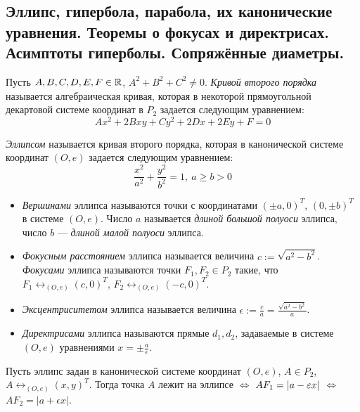 \subsection{Эллипс, гипербола, парабола, их канонические уравнения. Теоремы о фокусах и директрисах. Асимптоты гиперболы. Сопряжённые диаметры.}
    
    \begin{definition}
    	Пусть $A, B, C, D, E, F \in \mathbb{R}$, $A^2 + B^2 + C^2 \ne 0$. \textit{Кривой второго порядка} называется алгебраическая кривая, которая в некоторой прямоугольной декартовой системе координат в $P_2$ задается следующим уравнением:
    	\[Ax^2 + 2Bxy + Cy^2 + 2Dx + 2Ey + F = 0\]
    \end{definition}
    
    \begin{definition}
    	\textit{Эллипсом} называется кривая второго порядка, которая в канонической системе координат $(O, e)$ задается следующим уравнением:
    	\[\frac{x^2}{a^2} + \frac{y^2}{b^2} = 1,~a \ge b > 0\]
    	
    	\begin{itemize}
    		\item \textit{Вершинами} эллипса называются точки с координатами $(\pm a, 0)^T$, $(0, \pm b)^T$ в системе $(O, e)$. Число $a$ называется \textit{длиной большой полуоси} эллипса, число $b$ --- \textit{длиной малой полуоси} эллипса.
    		
    		\item \textit{Фокусным расстоянием} эллипса называется величина $c := \sqrt{a^2 - b^2}$. \textit{Фокусами} эллипса называются точки $F_1, F_2 \in P_2$ такие, что $F_1 \leftrightarrow_{(O, e)} (c, 0)^T$, $F_2 \leftrightarrow_{(O, e)} (-c, 0)^T$.
    		
    		\item \textit{Эксцентриситетом} эллипса называется величина $\epsilon := \frac{c}{a} = \frac{\sqrt{a^2 - b^2}}{a}$.
    		
    		\item \textit{Директрисами} эллипса называются прямые $d_1, d_2$, задаваемые в системе $(O, e)$ уравнениями $x = \pm \frac{a}{\epsilon}$.
    	\end{itemize}
    \end{definition}
    
    \begin{theorem}
    	Пусть эллипс задан в канонической системе координат $(O, e)$, $A \in P_2$, $A \leftrightarrow_{(O, e)} (x, y)^T$. Тогда точка $A$ лежит на эллипсе $\Leftrightarrow$ $AF_1 \hm{=} |a - \epsilon  x|$ $\Leftrightarrow$ $AF_2 = |a + \epsilon x|$.
    \end{theorem}
    
